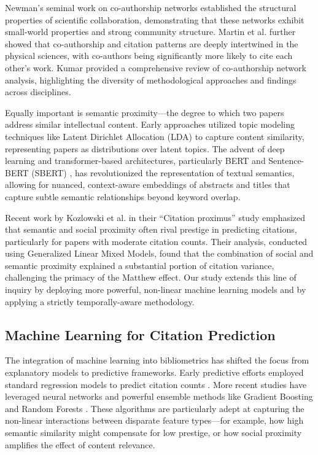 \documentclass[12pt,a4paper]{article}
\begin{document}
Newman's seminal work on co-authorship networks \citep{newman2004coauthorship} established the structural properties of scientific collaboration, demonstrating that these networks exhibit small-world properties and strong community structure. Martin et al. \citep{martin2013coauthorship} further showed that co-authorship and citation patterns are deeply intertwined in the physical sciences, with co-authors being significantly more likely to cite each other's work. Kumar \citep{kumar2015co} provided a comprehensive review of co-authorship network analysis, highlighting the diversity of methodological approaches and findings across disciplines.

Equally important is semantic proximity---the degree to which two papers address similar intellectual content. Early approaches utilized topic modeling techniques like Latent Dirichlet Allocation (LDA) \citep{blei2003latent} to capture content similarity, representing papers as distributions over latent topics. The advent of deep learning and transformer-based architectures, particularly BERT \citep{devlin2019bert} and Sentence-BERT (SBERT) \citep{reimers2019sentence}, has revolutionized the representation of textual semantics, allowing for nuanced, context-aware embeddings of abstracts and titles that capture subtle semantic relationships beyond keyword overlap.

Recent work by Kozlowski et al. \citep{kozlowski2025citation} in their ``Citation proximus'' study emphasized that semantic and social proximity often rival prestige in predicting citations, particularly for papers with moderate citation counts. Their analysis, conducted using Generalized Linear Mixed Models, found that the combination of social and semantic proximity explained a substantial portion of citation variance, challenging the primacy of the Matthew effect. Our study extends this line of inquiry by deploying more powerful, non-linear machine learning models and by applying a strictly temporally-aware methodology.

\subsection{Machine Learning for Citation Prediction}

The integration of machine learning into bibliometrics has shifted the focus from explanatory models to predictive frameworks. Early predictive efforts employed standard regression models to predict citation counts \citep{lokker2008prediction}. More recent studies have leveraged neural networks \citep{alohali2022machine} and powerful ensemble methods like Gradient Boosting \citep{natekin2013gradient} and Random Forests \citep{breiman2001random}. These algorithms are particularly adept at capturing the non-linear interactions between disparate feature types---for example, how high semantic similarity might compensate for low prestige, or how social proximity amplifies the effect of content relevance.
\end{document}
